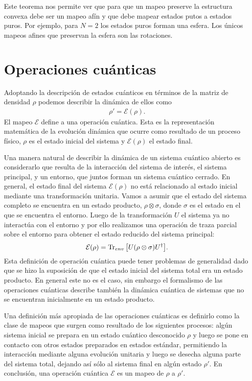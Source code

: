 \documentclass[11pt,dvipsnames]{report}
\newcommand{\E}{\mathcal{E}}
\begin{document}
Este teorema nos permite ver que para que un mapeo preserve la estructura 
convexa debe ser un mapeo afín y que debe mapear estados putos
a estados puros. Por ejemplo, para $N=2$ los estados puros forman una
esfera. Los únicos mapeos afines que preservan la esfera son las rotaciones.


\chapter{Operaciones cuánticas}

Adoptando la descripción de estados cuánticos en términos de la matriz de 
densidad $\rho$ podemos describir la dinámica de ellos como
\begin{align*}
	\rho '=\mathcal{E} (\rho).
\end{align*}
El mapeo $\mathcal{E}$ define a una operación cuántica. Esta es la 
representación matemática de la evolución dinámica que ocurre como
resultado de un proceso físico, $\rho$ es el estado inicial del 
sistema y $\mathcal{E}(\rho)$ el estado final.

Una manera natural de describir la dinámica de un sistema cuántico
abierto es considerarlo que resulta de la interacción del sistema
de interés, el sistema principal, y un entorno, que juntos forman
un sistema cuántico cerrado. En general, el estado final 
del sistema $\E (\rho)$ no está relacionado al estado inicial
mediante una transformación unitaria. Vamos a asumir que
el estado del sistema completo se encuentra en un estado
producto, $\rho \otimes \sigma$, donde $\sigma$ es el 
estado en el que se encuentra el entorno. Luego de la
transformación $U$ el sistema ya no interactúa con el 
entorno y por ello realizamos una operación de traza parcial sobre 
el entorno para obtener el estado reducido del sistema principal:
\begin{align}
	\E (\rho) = \Tr _{env}\qty[U \qty(\rho \otimes \sigma)U^{\dagger}].
	\label{eq:PTraceE(rho)}
\end{align}
Esta definición de operación cuántica puede tener problemas
de generalidad dado que se hizo la suposición de que el 
estado inicial del sistema total era un estado producto. En 
general este no es el caso, sin embargo el formalismo de las 
operaciones cuánticas describe también la dinámica cuántica
de sistemas que no se encuentran inicialmente en un estado
producto.

Una definición más apropiada de las operaciones cuánticas es
definirlo como la clase de mapeos que surgen como resultado de
los siguientes procesos: algún sistema inicial se prepara en un
estado cuántico desconocido $\rho$ y luego se pone en contacto
con otros estados preparados en estados estándar, permitiendo 
la interacción mediante alguna evolución unitaria y luego
se desecha alguna parte del sistema total, dejando así 
sólo al sistema final en algún estado $\rho'$. En conclusión, 
una operación cuántica $\E$ es un mapeo de $\rho$ a $\rho'$.
\end{document}
